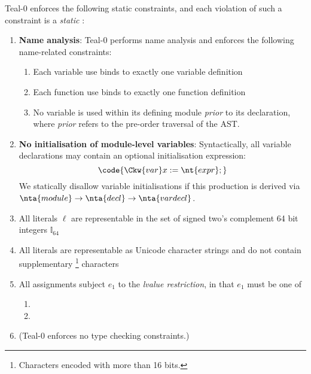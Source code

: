Teal-0 enforces the following static constraints, and each violation of such a constraint is a \emph{static \failure}:
\begin{enumerate}

\item \textbf{Name analysis}: Teal-0 performs name analysis and enforces the following name-related constraints:
  \begin{enumerate}
    \item Each variable use binds to exactly one variable definition
    \item Each function use binds to exactly one function definition
    \item No variable is used within its defining module \emph{prior}
      to its declaration, where \emph{prior} refers to the pre-order
      traversal of the AST.
  \end{enumerate}

\item \textbf{No initialisation of module-level variables}:
  Syntactically, all variable declarations  may contain an optional initialisation expression:
  \[
  \code{\Ckw{var} x := \nt{expr} ;}
    \]
    We statically disallow variable initialisations if this production
    is derived via
    $\nta{module}\rightarrow\nta{decl}\rightarrow\nta{vardecl}$.
  \item All  literals $\ell$ are representable in the set of signed two's complement 64 bit integers $\mathbb{I}_{64}$
  \item All  literals are representable as Unicode character strings and do not contain supplementary \footnote{Characters encoded with more than 16 bits.} characters
  \item All assignments  subject $e_1$ to the \emph{lvalue restriction}, in that $e_1$ must be one of
    \begin{enumerate}
      \item {}
      \item {}
    \end{enumerate}
\item (Teal-0 enforces no type checking constraints.)
\end{enumerate}

